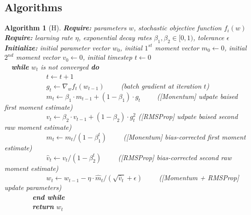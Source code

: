 \documentclass[letterpaper,11 pt]{article}
\newtheorem{algorithm}{Algorithm}
\begin{document}
\pagebreak
\begin{appendices}
\section{Algorithms}\label{algorithms}
\begin{algorithm}[H]
\caption{The ADAM algorithm computes a batch stochastic gradient to compute momentum and RMSProp vectors at each timestep, with a bias correction step accounting for first and second moment estimates. Model parameters are updated using this recursive gradient information.}
\label{alg:adam}

{\bf Require:}  parameters $w$, stochastic objective function $f_{i}(w)$ \\
{\bf Require:} learning rate $\eta$, exponential decay rates $\beta_1, \beta_2 \in [0,1)$, tolerance $\epsilon$ \\
{\bf Initialize:} initial parameter vector $w_{0}$, initial $1^{st}$ moment vector $m_0 \leftarrow 0$, initial $2^{nd}$ moment vector $v_0 \leftarrow 0$, initial timestep $t \leftarrow 0$ \\
\-\ \-\ {\bf while} $w_t$ is not converged {\bf do} \\
\-\ \-\ \-\ \-\ \-\ \-\ \-\ \-\ \-\ \-\ \-\ \-\   $t \leftarrow t+1$ \\
\-\ \-\ \-\ \-\ \-\ \-\ \-\ \-\ \-\ \-\ \-\ \-\   $g_{t} \leftarrow \nabla_{w} f_{t} (w_{t-1}) $ \-\ \-\ \-\ \-\  (\textit{batch gradient at iteration $t$}) \\
\-\ \-\ \-\ \-\ \-\ \-\ \-\ \-\ \-\ \-\ \-\ \-\   $m_{t} \leftarrow \beta_{1} \cdot m_{t-1} + (1 - \beta_{1}) \cdot g_{t}$ \-\ \-\ \-\ \-\  (\textit{[Monentum] udpate baised first moment estimate}) \\
\-\ \-\ \-\ \-\ \-\ \-\ \-\ \-\ \-\ \-\ \-\ \-\   $v_{t} \leftarrow \beta_{2} \cdot v_{t-1} + (1 - \beta_{2}) \cdot g_{t}^{2}$ (\textit{[RMSProp] udpate baised second raw moment estimate})  \\
\-\ \-\ \-\ \-\ \-\ \-\ \-\ \-\ \-\ \-\ \-\ \-\    $\hat{m}_{t} \leftarrow m_{t} / (1 - \beta_{1}^t) $ \-\ \-\ \-\ \-\  (\textit{[Monentum]  bias-corrected first moment estimate}) \\
\-\ \-\ \-\ \-\ \-\ \-\ \-\ \-\ \-\ \-\ \-\ \-\    $\hat{v}_{t} \leftarrow v_{t} / (1 - \beta_{2}^t) $ \-\ \-\ \-\ \-\  (\textit{[RMSProp] bias-corrected second raw moment estimate})  \\
\-\ \-\ \-\ \-\ \-\ \-\ \-\ \-\ \-\ \-\ \-\ \-\   $w_{t} \leftarrow w_{t-1} - \eta \cdot \hat{m}_{t} / ( \sqrt{\hat{v}_{t}} + \epsilon ) $ \-\ \-\ \-\ \-\  (\textit{[Momentum + RMSProp] update parameters}) \\
\-\ \-\ \-\ \-\ \-\ \-\ \-\ \-\  {\bf end while} \\
\-\ \-\ \-\ \-\ \-\ \-\ \-\ \-\  {\bf return} $w_{t}$ \\


\end{algorithm}
\end{appendices}
\end{document}
